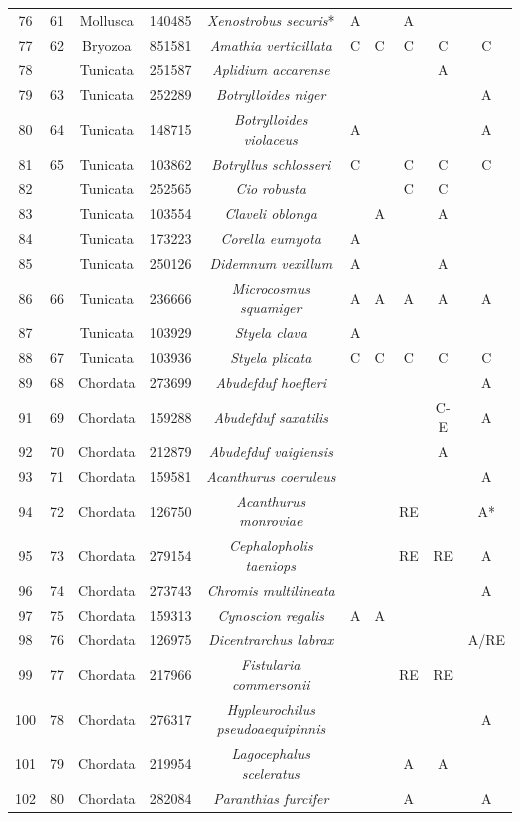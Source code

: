 \documentclass{article}
\begin{document}
\begin{landscape}
\begin{center}
\begin{longtable}{|c|c|c|c|c|c|c|c|c|c|}
76&61&Mollusca&140485&\textit{Xenostrobus securis}*&A&&A&&\\
77&62&Bryozoa&851581&\textit{Amathia verticillata}&C&C&C&C&C\\
78&&Tunicata&251587&\textit{Aplidium accarense}&&&&A&\\
79&63&Tunicata&252289&\textit{Botrylloides niger}&&&&&A\\
80&64&Tunicata&148715&\textit{Botrylloides violaceus}&A&&&&A\\
81&65&Tunicata&103862&\textit{Botryllus schlosseri}&C&&C&C&C\\
82&&Tunicata&252565&\textit{Cio robusta}&&&C&C&\\
83&&Tunicata&103554&\textit{Claveli oblonga}&&A&&A&\\
84&&Tunicata&173223&\textit{Corella eumyota}&A&&&&\\
85&&Tunicata&250126&\textit{Didemnum vexillum}&A&&&A&\\
86&66&Tunicata&236666&\textit{Microcosmus squamiger}&A&A&A&A&A\\
87&&Tunicata&103929&\textit{Styela clava}&A&&&&\\
88&67&Tunicata&103936&\textit{Styela plicata}&C&C&C&C&C\\
89&68&Chordata&273699&\textit{Abudefduf hoefleri}&&&&&A\\
91&69&Chordata&159288&\textit{Abudefduf saxatilis}&&&&C-E&A\\
92&70&Chordata&212879&\textit{Abudefduf vaigiensis}&&&&A&\\
93&71&Chordata&159581&\textit{Acanthurus coeruleus}&&&&&A\\
94&72&Chordata&126750&\textit{Acanthurus monroviae}&&&RE&&A*\\
95&73&Chordata&279154&\textit{Cephalopholis taeniops}&&&RE&RE&A\\
96&74&Chordata&273743&\textit{Chromis multilineata}&&&&&A\\
97&75&Chordata&159313&\textit{Cynoscion regalis}&A&A&&&\\
98&76&Chordata&126975&\textit{Dicentrarchus labrax}&&&&&A/RE\\
99&77&Chordata&217966&\textit{Fistularia commersonii}&&&RE&RE&\\
100&78&Chordata&276317&\textit{Hypleurochilus pseudoaequipinnis}&&&&&A\\
101&79&Chordata&219954&\textit{Lagocephalus sceleratus}&&&A&A&\\
102&80&Chordata&282084&\textit{Paranthias furcifer}&&&A&&A\\

\end{longtable}
\end{center}
\end{landscape}
\end{document}
